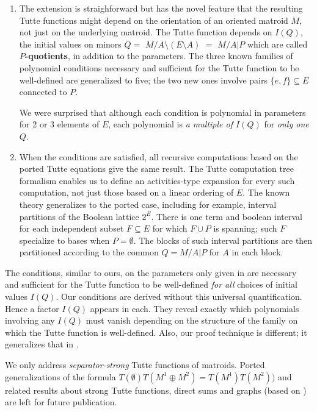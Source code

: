 \documentclass[12pt,leqno]{amsart}
\theoremstyle{remark}
\begin{document}
\begin{enumerate}
\item
The extension is straighforward
but has the novel feature that the resulting
Tutte functions might depend on the orientation
of an oriented matroid $M$, not just on the
underlying matroid.  The Tutte function
depends on $I(Q)$, the initial values on
minors $Q = $ $M/A\setminus (E\setminus A)$
$=$ $M/A|P$ which are called {\bf $P$-quotients},
in addition to the parameters.  The three known
\cite{MR93a:05047,BollobasRiordanTuttePolyColored,Ellis-Monaghan-Traldi}
families
of polynomial conditions necessary and sufficient 
for the Tutte function to be well-defined 
are generalized to five; the two new ones involve
pairs $\{e,f\}\subseteq E$ connected to $P$.  

We were surprised that although each condition
is polynomial in parameters for 2 or 3 elements of $E$,
each polynomial is \emph{a multiple of
$I(Q)$} for \emph{only one} $Q$.

\item
When the conditions are satisfied, all recursive
computations based on the ported Tutte equations give the
same result.  The Tutte computation tree formalism 
\cite{GordonMcMachonGreedoid}
enables us to 
define an activities-type expansion for every such
computation, not just those based on a linear
ordering of $E$.  The known theory generalizes to
the ported case, including for example, interval
partitions of the Boolean lattice $2^{E}$.  
There is 
one term and boolean interval for
each independent subset $F\subseteq E$ for
which $F\cup P$ is spanning; such $F$ specialize
to bases when $P=\emptyset$.
The blocks
of such interval partitions are then partitioned according
to the common $Q=M/A|P$ for $A$ in each block.
\end{enumerate}

The conditions, similar to ours, on the parameters 
only given in \cite{RelTuttePoly}
are necessary and sufficient
for the Tutte function to be well-defined
\emph{for all} choices of initial values $I(Q)$.
Our conditions are derived without
this universal quantification.  Hence a factor $I(Q)$
appears in each.  They reveal 
exactly which polynomials involving any $I(Q)$
must vanish depending on the structure of 
the family on which the Tutte function is
well-defined.  Also, our proof technique is
different; it generalizes that 
in \cite{Ellis-Monaghan-Traldi}.

We only address 
\emph{separator-strong}
Tutte functions of matroids.
Ported generalizations of 
the 
formula
$T(\emptyset) T(M^1\oplus M^2) 
= T(M^1) T(M^2))$
and related results about strong Tutte functions\cite{MR93a:05047},
direct sums 
and graphs (based on 
\cite{MR93a:05047,BollobasRiordanTuttePolyColored,Ellis-Monaghan-Traldi}) are 
left for future publication.
\end{document}
